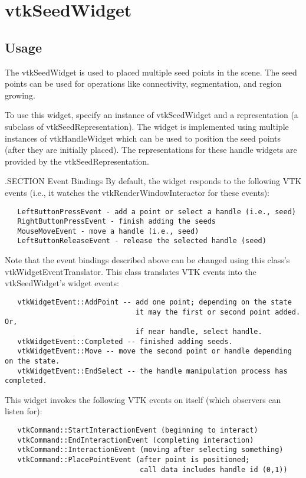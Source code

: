 \section{vtkSeedWidget}

\subsection{Usage}

 The vtkSeedWidget is used to placed multiple seed points in the scene.
 The seed points can be used for operations like connectivity, segmentation,
 and region growing. 
 
 To use this widget, specify an instance of vtkSeedWidget and a
 representation (a subclass of vtkSeedRepresentation). The widget is
 implemented using multiple instances of vtkHandleWidget which can be used
 to position the seed points (after they are initially placed). The
 representations for these handle widgets are provided by the
 vtkSeedRepresentation.

 .SECTION Event Bindings
 By default, the widget responds to the following VTK events (i.e., it
 watches the vtkRenderWindowInteractor for these events):
 \begin{verbatim}
   LeftButtonPressEvent - add a point or select a handle (i.e., seed)
   RightButtonPressEvent - finish adding the seeds
   MouseMoveEvent - move a handle (i.e., seed)
   LeftButtonReleaseEvent - release the selected handle (seed)
 \end{verbatim}

 Note that the event bindings described above can be changed using this
 class's vtkWidgetEventTranslator. This class translates VTK events 
 into the vtkSeedWidget's widget events:
 \begin{verbatim}
   vtkWidgetEvent::AddPoint -- add one point; depending on the state
                               it may the first or second point added. Or,
                               if near handle, select handle.
   vtkWidgetEvent::Completed -- finished adding seeds.
   vtkWidgetEvent::Move -- move the second point or handle depending on the state.
   vtkWidgetEvent::EndSelect -- the handle manipulation process has completed.
 \end{verbatim}

 This widget invokes the following VTK events on itself (which observers
 can listen for):
 \begin{verbatim}
   vtkCommand::StartInteractionEvent (beginning to interact)
   vtkCommand::EndInteractionEvent (completing interaction)
   vtkCommand::InteractionEvent (moving after selecting something)
   vtkCommand::PlacePointEvent (after point is positioned; 
                                call data includes handle id (0,1))
 \end{verbatim}

